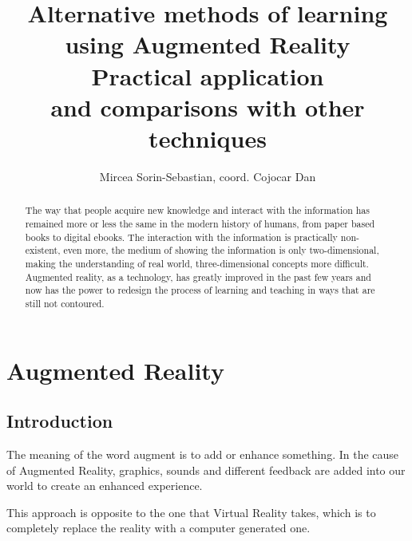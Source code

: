 \documentclass[12 pct]{report}
\begin{document}
\title{%
  Alternative methods of learning using Augmented Reality\\
  \large Practical application \\
    and comparisons with other techniques}

\author{Mircea Sorin-Sebastian, coord. Cojocar Dan}

\maketitle

\begin{abstract}
The way that people acquire new knowledge and interact with the information has remained more or less the same in the modern history of humans, from paper based books to digital ebooks. The interaction with the information is practically non-existent, even more, the medium of showing the information is only two-dimensional, making the understanding of real world, three-dimensional concepts more difficult. Augmented reality, as a technology, has greatly improved in the past few years and now has the power to redesign the process of learning and teaching in ways that are still not contoured. 
\end{abstract}

\tableofcontents



\chapter{Augmented Reality}

\section{Introduction}
The meaning of the word augment is to add or enhance something. In the cause of Augmented Reality, graphics, sounds and different feedback are added into our world to create an enhanced experience.

This approach is opposite to the one that Virtual Reality takes, which is to completely replace the reality with a computer generated one.
\end{document}
